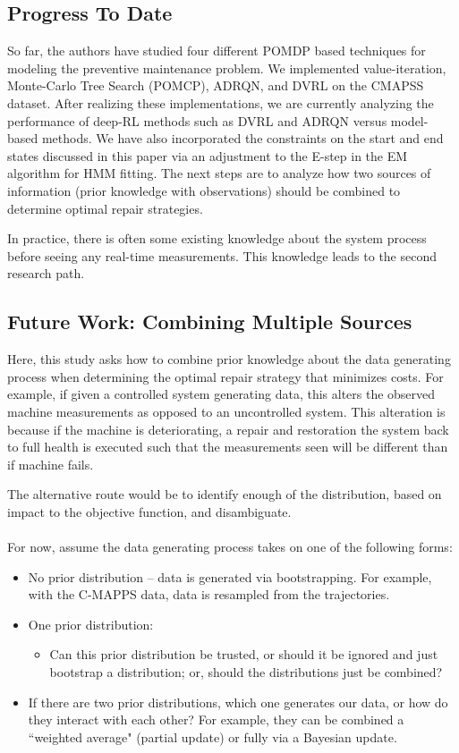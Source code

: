 \documentclass[english]{article}
\numberwithin{equation}{section}
\begin{document}
\subsection*{Progress To Date}

So far, the authors have studied four different POMDP based techniques for modeling the preventive maintenance problem. We implemented value-iteration, Monte-Carlo Tree Search (POMCP), ADRQN, and DVRL on the CMAPSS dataset. After realizing these implementations, we are currently analyzing the performance of deep-RL methods such as DVRL and ADRQN versus model-based methods. We have also incorporated the constraints on the start and end states discussed in this paper via an adjustment to the E-step in the EM algorithm for HMM fitting. The next steps are to analyze how two sources of information (prior knowledge with observations) should be combined to determine optimal repair strategies.

In practice, there is often some existing knowledge about the system process before seeing any real-time measurements. This knowledge leads to the second research path.

\subsection*{Future Work: Combining Multiple Sources}

Here, this study asks how to combine prior knowledge about the data generating process when determining the optimal repair strategy that minimizes costs. For example, if given a controlled system generating data, this alters the observed machine measurements as opposed to an uncontrolled system. This alteration is because if the machine is deteriorating, a repair and restoration the system back to full health is executed such that the measurements seen will be different than if machine fails.

The alternative route would be to identify enough of the distribution, based on impact to the objective function, and disambiguate. 
\\
\\
For now, assume the data generating process takes on one of the following forms:
\begin{itemize}
	\item No prior distribution -- data is generated via bootstrapping. For example, with the C-MAPPS data, data is resampled from the trajectories.
	\item One prior distribution:
	\begin{itemize}
		\item Can this prior distribution be trusted, or should it be ignored and just bootstrap a distribution; or, should the distributions just be combined?
	\end{itemize}
	\item If there are two prior distributions, which one generates our data, or how do they interact with each other? For example, they can be combined a ``weighted average" (partial update) or fully via a Bayesian update.
\end{itemize}
\end{document}
